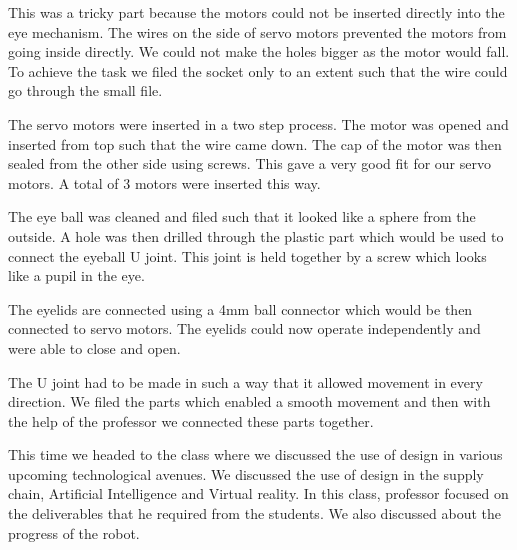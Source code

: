 \documentclass[index=totoc,hyperref,openany]{labbook} %
\begin{document}

{\let\clearpage\relax {}}

This was a tricky part because the motors could not be inserted directly into the eye mechanism. The wires on the side of servo motors prevented the motors from going inside directly. We could not make the holes bigger as the motor would fall. To achieve the task we filed the socket only to an extent such that the wire could go through the small file.

The servo motors were inserted in a two step process. The motor was opened and inserted from top such that the wire came down. The cap of the motor was then sealed from the other side using screws. This gave a very good fit for our servo motors. A total of $3$ motors were inserted this way.


{\let\clearpage\relax {}}

The eye ball was cleaned and filed such that it looked like a sphere from the outside. A hole was then drilled through the plastic part which would be used to connect the eyeball U joint. This joint is held together by a screw which looks like a pupil in the eye.

The eyelids are connected using a 4mm ball connector which would be then connected to servo motors. The eyelids could now operate independently and were able to close and open.

The U joint had to be made in such a way that it allowed movement in every direction. We filed the parts which enabled a smooth movement and then with the help of the professor we connected these parts together.


{\let\clearpage\relax {}}

This time we headed to the class where we discussed the use of design in various upcoming technological avenues. We discussed the use of design in the supply chain, Artificial Intelligence and Virtual reality. In this class, professor focused on the deliverables that he required from the students. We also discussed about the progress of the robot.
\end{document}
